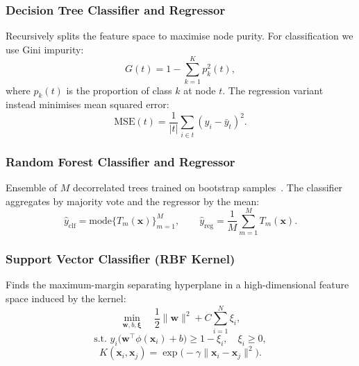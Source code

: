 \documentclass[conference]{IEEEtran}
\begin{document}
\subsubsection{Decision Tree Classifier and Regressor}
Recursively splits the feature space to maximise node purity. For classification we use Gini impurity:
\begin{equation}
G(t) = 1 - \sum_{k=1}^{K} p_k^{2}(t),
\end{equation}
where $p_k(t)$ is the proportion of class $k$ at node $t$. The regression variant instead minimises mean squared error:
\begin{equation}
\mathrm{MSE}(t) = \frac{1}{|t|}\sum_{i \in t}(y_i - \bar{y}_t)^{2}.
\end{equation}

\subsubsection{Random Forest Classifier and Regressor}
Ensemble of $M$ decorrelated trees trained on bootstrap samples~\cite{breiman2001rf}. The classifier aggregates by majority vote and the regressor by the mean:
\begin{equation}
\hat{y}_{\text{clf}} = \mathrm{mode}\{T_m(\mathbf{x})\}_{m=1}^{M}, \qquad
\hat{y}_{\text{reg}} = \frac{1}{M}\sum_{m=1}^{M} T_m(\mathbf{x}).
\end{equation}

\subsubsection{Support Vector Classifier (RBF Kernel)}
Finds the maximum-margin separating hyperplane in a high-dimensional feature space induced by the kernel:
\begin{equation}
\min_{\mathbf{w}, b, \boldsymbol{\xi}} \quad \frac{1}{2}\|\mathbf{w}\|^{2} + C\sum_{i=1}^{N}\xi_i,
\end{equation}
\begin{equation}
\text{s.t. } y_i\bigl(\mathbf{w}^{\top}\phi(\mathbf{x}_i) + b\bigr) \geq 1 - \xi_i, \quad \xi_i \geq 0,
\end{equation}
\begin{equation}
K(\mathbf{x}_i, \mathbf{x}_j) = \exp\bigl(-\gamma\|\mathbf{x}_i - \mathbf{x}_j\|^{2}\bigr).
\end{equation}
\end{document}
